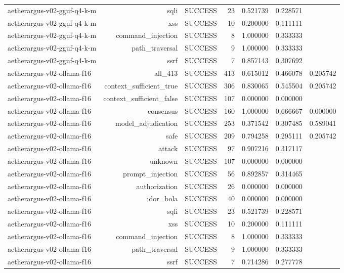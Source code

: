 \begin{table}[t]
\begin{tabular}{lrrrrrr}
aetherargus-v02-gguf-q4-k-m & sqli & SUCCESS & 23 & 0.521739 & 0.228571 &  \\
aetherargus-v02-gguf-q4-k-m & xss & SUCCESS & 10 & 0.200000 & 0.111111 &  \\
aetherargus-v02-gguf-q4-k-m & command\_injection & SUCCESS & 8 & 1.000000 & 0.333333 &  \\
aetherargus-v02-gguf-q4-k-m & path\_traversal & SUCCESS & 9 & 1.000000 & 0.333333 &  \\
aetherargus-v02-gguf-q4-k-m & ssrf & SUCCESS & 7 & 0.857143 & 0.307692 &  \\
aetherargus-v02-ollama-f16 & all\_413 & SUCCESS & 413 & 0.615012 & 0.466078 & 0.205742 \\
aetherargus-v02-ollama-f16 & context\_sufficient\_true & SUCCESS & 306 & 0.830065 & 0.545504 & 0.205742 \\
aetherargus-v02-ollama-f16 & context\_sufficient\_false & SUCCESS & 107 & 0.000000 & 0.000000 &  \\
aetherargus-v02-ollama-f16 & consensus & SUCCESS & 160 & 1.000000 & 0.666667 & 0.000000 \\
aetherargus-v02-ollama-f16 & model\_adjudication & SUCCESS & 253 & 0.371542 & 0.307485 & 0.589041 \\
aetherargus-v02-ollama-f16 & safe & SUCCESS & 209 & 0.794258 & 0.295111 & 0.205742 \\
aetherargus-v02-ollama-f16 & attack & SUCCESS & 97 & 0.907216 & 0.317117 &  \\
aetherargus-v02-ollama-f16 & unknown & SUCCESS & 107 & 0.000000 & 0.000000 &  \\
aetherargus-v02-ollama-f16 & prompt\_injection & SUCCESS & 56 & 0.892857 & 0.314465 &  \\
aetherargus-v02-ollama-f16 & authorization & SUCCESS & 26 & 0.000000 & 0.000000 &  \\
aetherargus-v02-ollama-f16 & idor\_bola & SUCCESS & 40 & 0.000000 & 0.000000 &  \\
aetherargus-v02-ollama-f16 & sqli & SUCCESS & 23 & 0.521739 & 0.228571 &  \\
aetherargus-v02-ollama-f16 & xss & SUCCESS & 10 & 0.200000 & 0.111111 &  \\
aetherargus-v02-ollama-f16 & command\_injection & SUCCESS & 8 & 1.000000 & 0.333333 &  \\
aetherargus-v02-ollama-f16 & path\_traversal & SUCCESS & 9 & 1.000000 & 0.333333 &  \\
aetherargus-v02-ollama-f16 & ssrf & SUCCESS & 7 & 0.714286 & 0.277778 &  \\
\bottomrule
\end{tabular}
\end{table}
